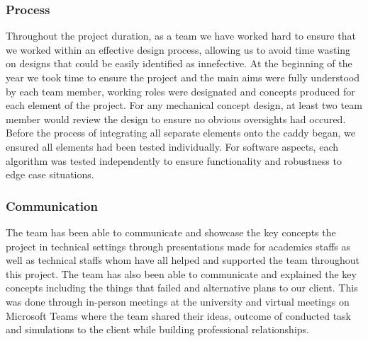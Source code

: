 \documentclass[11pt,landscape]{article}
\begin{document}
\begin{multicols}{3}
\subsubsection{Process}
Throughout the project duration, as a team we have worked hard to ensure that we
worked within an effective design process, allowing us to avoid time wasting on
designs that could be easily identified as innefective. At the beginning of the
year we took time to ensure the project and the main aims were fully understood
by each team member, working roles were designated and concepts produced for
each element of the project. For any mechanical concept design, at least two
team member would review the design to ensure no obvious oversights had occured.
Before the process of integrating all separate elements onto the caddy began, we
ensured all elements had been tested individually. For software aspects, each
algorithm was tested independently to ensure functionality and robustness to
edge case situations. 


\subsubsection{Communication}
The team has been able to communicate and showcase the key concepts the project
in technical settings through presentations made for academics staffs as well as
technical staffs whom have all helped and supported the team throughout this
project. The team has also been able to communicate and explained the key
concepts including the things that failed and alternative plans to our client.
This was done through in-person meetings at the university and virtual meetings
on Microsoft Teams where the team shared their ideas, outcome of conducted task
and simulations to the client while building professional relationships.

\nocite{*}



\end{multicols}
\end{document}
